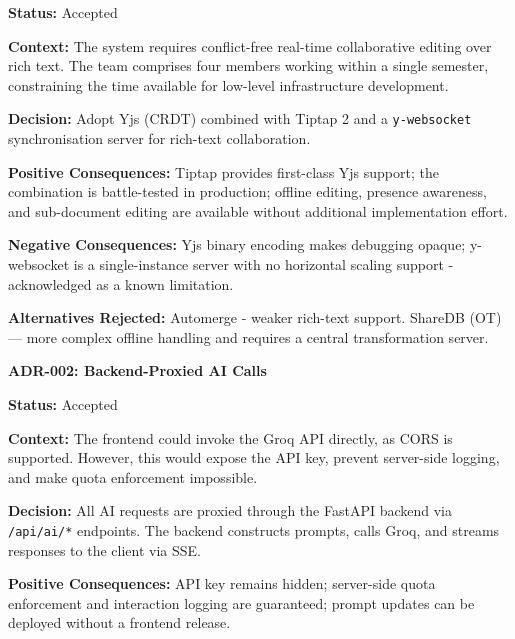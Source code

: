 \documentclass{article}
\begin{document}
\vspace{3pt}
\noindent\textbf{Status:} Accepted

\vspace{3pt}
\noindent\textbf{Context:} The system requires conflict-free real-time collaborative editing over rich text. The team comprises four members working within a single semester, constraining the time available for low-level infrastructure development.

\vspace{3pt}
\noindent\textbf{Decision:} Adopt Yjs (CRDT) combined with Tiptap 2 and a \texttt{y-websocket} synchronisation server for rich-text collaboration.

\vspace{3pt}
\noindent\textbf{Positive Consequences:} Tiptap provides first-class Yjs support; the combination is battle-tested in production; offline editing, presence awareness, and sub-document editing are available without additional implementation effort.

\vspace{3pt}
\noindent\textbf{Negative Consequences:} Yjs binary encoding makes debugging opaque; y-websocket is a single-instance server with no horizontal scaling support - acknowledged as a known limitation.

\vspace{3pt}
\noindent\textbf{Alternatives Rejected:} Automerge - weaker rich-text support. ShareDB (OT) — more complex offline handling and requires a central transformation server.

\vspace{15pt}
\noindent\textbf{ADR-002: Backend-Proxied AI Calls}

\vspace{3pt}
\noindent\textbf{Status:} Accepted

\vspace{3pt}
\noindent\textbf{Context:} The frontend could invoke the Groq API directly, as CORS is supported. However, this would expose the API key, prevent server-side logging, and make quota enforcement impossible.

\vspace{3pt}
\noindent\textbf{Decision:} All AI requests are proxied through the FastAPI backend via \texttt{/api/ai/*} endpoints. The backend constructs prompts, calls Groq, and streams responses to the client via SSE.

\vspace{3pt}
\noindent\textbf{Positive Consequences:} API key remains hidden; server-side quota enforcement and interaction logging are guaranteed; prompt updates can be deployed without a frontend release.
\end{document}
